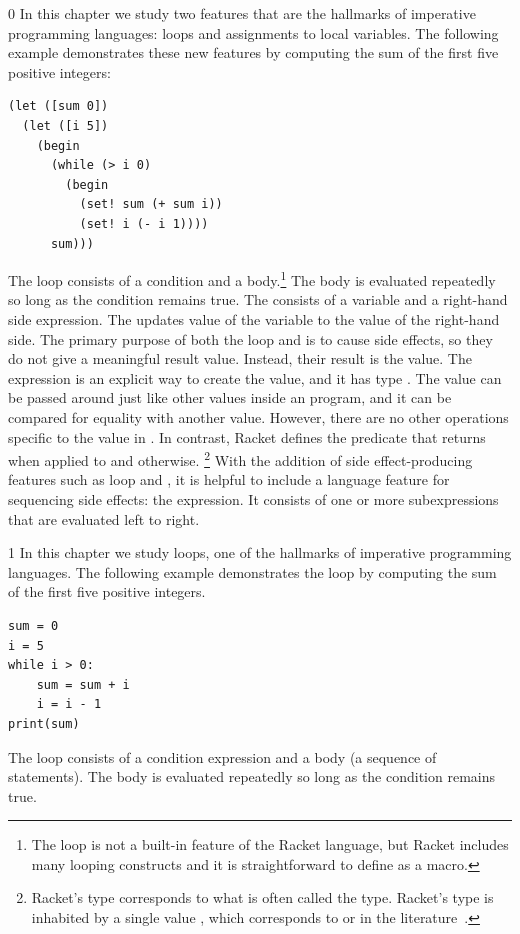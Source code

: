 \documentclass[7x10]{TimesAPriori_MIT}%
\def\racketEd{0}
\def\pythonEd{1}
\def\edition{0}
\numberwithin{theorem}{chapter}
\numberwithin{definition}{chapter}
\numberwithin{equation}{chapter}
\begin{document}
{\if\edition\racketEd
%
In this chapter we study two features that are the hallmarks of
imperative programming languages: loops and assignments to local
variables. The following example demonstrates these new features by
computing the sum of the first five positive integers:
\begin{lstlisting}
(let ([sum 0])
  (let ([i 5])
    (begin
      (while (> i 0)
        (begin
          (set! sum (+ sum i))
          (set! i (- i 1))))
      sum)))
\end{lstlisting}
The  loop consists of a condition and a
body.\footnote{The  loop is not a built-in
feature of the Racket language, but Racket includes many looping
constructs and it is straightforward to define  as a
macro.} The body is evaluated repeatedly so long as the condition
remains true.
%
The  consists of a variable and a right-hand side
expression.  The  updates value of the variable to the
value of the right-hand side.
%
The primary purpose of both the  loop and  is
to cause side effects, so they do not give a meaningful result
value. Instead, their result is the  value.  The
expression  is an explicit way to create the
 value, and it has type .  The
 value can be passed around just like other values
inside an \LangLoop{} program, and it can be compared for equality with
another  value. However, there are no other operations
specific to the  value in \LangLoop{}. In contrast,
Racket defines the   predicate that returns 
when applied to  and  otherwise.%
%
\footnote{Racket's  type corresponds to what is often
  called the  type. Racket's  type is inhabited
  by a single value , which corresponds to 
  or \code{()} in the literature~\citep{Pierce:2002hj}.}
%
With the addition of side effect-producing features such as
 loop and , it is helpful to include a language
feature for sequencing side effects: the  expression. It
consists of one or more subexpressions that are evaluated
left to right.
%
\fi}

{\if\edition\pythonEd
%
In this chapter we study loops, one of the hallmarks of imperative
programming languages. The following example demonstrates the
 loop by computing the sum of the first five positive
integers.
\begin{lstlisting}
sum = 0
i = 5
while i > 0:
    sum = sum + i
    i = i - 1
print(sum)
\end{lstlisting}
The  loop consists of a condition expression and a body (a
sequence of statements). The body is evaluated repeatedly so long as
the condition remains true.
%
\fi}
\end{document}

